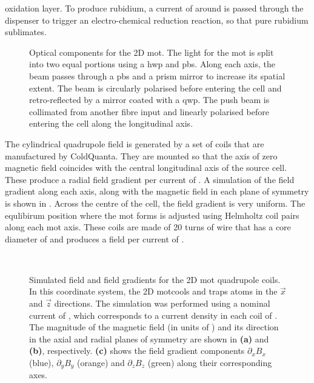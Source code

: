 oxidation layer. To produce rubidium, a current of around  is passed through the dispenser
to trigger an electro-chemical reduction reaction, so that pure rubidium sublimates.
\begin{figure}[!htbp]
	\centering
	\def\svgwidth{0.5\textwidth}
	
	\caption[Optical components for the 2D \ac{mot}]{Optical components for the 2D \ac{mot}. The light for the \ac{mot} is split into two equal portions using a \ac{hwp} and \ac{pbs}. Along each axis, the beam passes through a \ac{pbs} and a prism mirror to increase its spatial extent. The beam is circularly polarised before entering the cell and retro-reflected by a mirror coated with a \ac{qwp}. The push beam is collimated from another fibre input and linearly polarised before entering the cell along the longitudinal axis.}
	\label{fig:2D_mot_optics}
\end{figure}
\par\noindent The cylindrical quadrupole field is generated by a set of coils
that are manufactured by ColdQuanta. They are mounted so that the axis of
zero magnetic field coincides with the central longitudinal axis of the source
cell. These produce a radial field gradient per current of
. A simulation of the field
gradient along each axis, along with the magnetic field in each plane of
symmetry is shown in .  
Across the centre of the cell, the field gradient is very uniform. The equlibirum position where the \ac{ mot} forms is adjusted using Helmholtz coil pairs along each \ac{mot} axis. These coils are made of 20 turns of wire that has a
core diameter of  and produces a field per current of
.
\begin{figure}[!htbp]
	\centering
	\def\svgwidth{\columnwidth}
	\\
	\caption[Simulated field and field gradients for the 2D \ac{mot} quadrupole
		coils]{Simulated field and field gradients for the 2D \ac{mot}
		quadrupole coils. In this coordinate system, the 2D \ac{mot}cools and
		traps atoms in the \(\vec{x}\) and \(\vec{z}\) directions. The
		simulation was performed using a nominal current of
		, which corresponds to a current density in each
		coil of . The magnitude of
		the magnetic field (in units of \sivalue{}{\gauss}) and its direction in
		the axial and radial planes of symmetry are shown in \textbf{(a)} and
		\textbf{(b)}, respectively. \textbf{(c)} shows the field gradient
		components \(\partial_x B_x\) (blue), \(\partial_y B_y\) (orange) and
		\(\partial_z B_z\) (green) along their corresponding axes.}
	\label{fig:2d_mot_field_gradient}
\end{figure}
